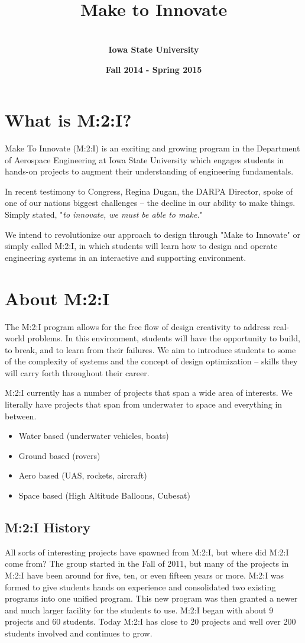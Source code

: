 \documentclass[10pt,foldmark,notumble]{leaflet}
\title{\bf \ \\ Make to Innovate}
\author{%
\Large \bf \ \\ Iowa State University
}
\date{\bf Fall 2014 - Spring 2015}
\begin{document}
\maketitle
\section{What is M:2:I?} Make To Innovate (M:2:I) is an exciting and growing program in the Department of Aerospace Engineering at Iowa State University which engages students in hands-on projects to augment their understanding of engineering fundamentals.

In recent testimony to Congress, Regina Dugan, the DARPA Director, spoke of one of our nations biggest challenges – the decline in our ability to make things.  Simply stated, "\emph{to innovate, we must be able to make.}"

We intend to revolutionize our approach to design through "Make to Innovate" or simply called M:2:I, in which students will learn how to design and operate engineering systems in an interactive and supporting environment.

\section{About M:2:I}
The M:2:I program allows for the free flow of design creativity to address real-world problems. In this environment, students will have the opportunity to build, to break, and to learn from their failures. We aim to introduce students to some of the complexity of systems and the concept of design optimization – skills they will carry forth throughout their career.

M:2:I currently has a number of projects that span a wide area of interests.  We literally have projects that span from underwater to space and everything in between.  
\begin{itemize}
\item Water based (underwater vehicles, boats)
\item Ground based (rovers)
\item Aero based (UAS, rockets, aircraft)
\item Space based (High Altitude Balloons, Cubesat)
\end{itemize}
\subsection{M:2:I History}
All sorts of interesting projects have spawned from M:2:I, but where did M:2:I come from? The group started in the Fall of 2011, but many of the projects in M:2:I have been around for five, ten, or even fifteen years or more. M:2:I was formed to give students hands on experience and consolidated two existing programs into one unified program.  This new program was then granted a newer and much larger facility for the students to use.  M:2:I began with about 9 projects and 60 students.  Today M:2:I has close to 20 projects and well over 200 students involved and continues to grow.
\end{document}

